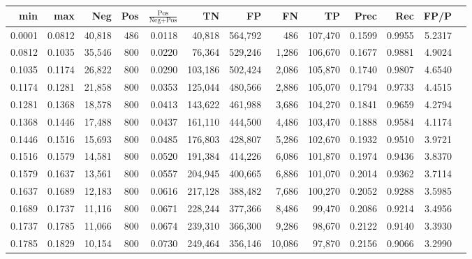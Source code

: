 \begin{tabular}{rrrrrrrrrrrrr}
\toprule
   min &    max &    Neg &   Pos & $\frac{\text{Pos}}{\text{Neg}+\text{Pos}}$ &      TN &      FP &      FN &      TP &   Prec &    Rec &   FP/P \\
\midrule
0.0001 & 0.0812 & 40,818 &   486 &                                     0.0118 &  40,818 & 564,792 &     486 & 107,470 & 0.1599 & 0.9955 & 5.2317 \\
0.0812 & 0.1035 & 35,546 &   800 &                                     0.0220 &  76,364 & 529,246 &   1,286 & 106,670 & 0.1677 & 0.9881 & 4.9024 \\
0.1035 & 0.1174 & 26,822 &   800 &                                     0.0290 & 103,186 & 502,424 &   2,086 & 105,870 & 0.1740 & 0.9807 & 4.6540 \\
0.1174 & 0.1281 & 21,858 &   800 &                                     0.0353 & 125,044 & 480,566 &   2,886 & 105,070 & 0.1794 & 0.9733 & 4.4515 \\
0.1281 & 0.1368 & 18,578 &   800 &                                     0.0413 & 143,622 & 461,988 &   3,686 & 104,270 & 0.1841 & 0.9659 & 4.2794 \\
0.1368 & 0.1446 & 17,488 &   800 &                                     0.0437 & 161,110 & 444,500 &   4,486 & 103,470 & 0.1888 & 0.9584 & 4.1174 \\
0.1446 & 0.1516 & 15,693 &   800 &                                     0.0485 & 176,803 & 428,807 &   5,286 & 102,670 & 0.1932 & 0.9510 & 3.9721 \\
0.1516 & 0.1579 & 14,581 &   800 &                                     0.0520 & 191,384 & 414,226 &   6,086 & 101,870 & 0.1974 & 0.9436 & 3.8370 \\
0.1579 & 0.1637 & 13,561 &   800 &                                     0.0557 & 204,945 & 400,665 &   6,886 & 101,070 & 0.2014 & 0.9362 & 3.7114 \\
0.1637 & 0.1689 & 12,183 &   800 &                                     0.0616 & 217,128 & 388,482 &   7,686 & 100,270 & 0.2052 & 0.9288 & 3.5985 \\
0.1689 & 0.1737 & 11,116 &   800 &                                     0.0671 & 228,244 & 377,366 &   8,486 &  99,470 & 0.2086 & 0.9214 & 3.4956 \\
0.1737 & 0.1785 & 11,066 &   800 &                                     0.0674 & 239,310 & 366,300 &   9,286 &  98,670 & 0.2122 & 0.9140 & 3.3930 \\
0.1785 & 0.1829 & 10,154 &   800 &                                     0.0730 & 249,464 & 356,146 &  10,086 &  97,870 & 0.2156 & 0.9066 & 3.2990 \\

\end{tabular}
